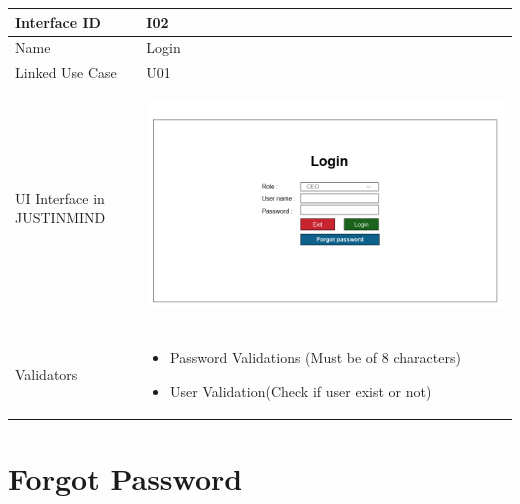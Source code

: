 \documentclass[12pt,a4paper]{report}
\begin{document}
\begin{tabular}{ | m{3cm} | m{12cm}| } \hline

Interface ID & I02  \\\hline

Name  	      & Login  \\ \hline

Linked Use Case & U01 \\ \hline

UI Interface in JUSTINMIND & \begin{center} \includegraphics[scale=0.3]{./UIs for Latex Reports/UI-002 Login@1x.png}\end{center}  \\ \hline

Validators & 
\begin{itemize}
\item   Password Validations (Must be of 8 characters)
\item   User Validation(Check if user exist or not)

\end{itemize}
\\ \hline

\end{tabular} 
\section{Forgot Password }
\end{document}
